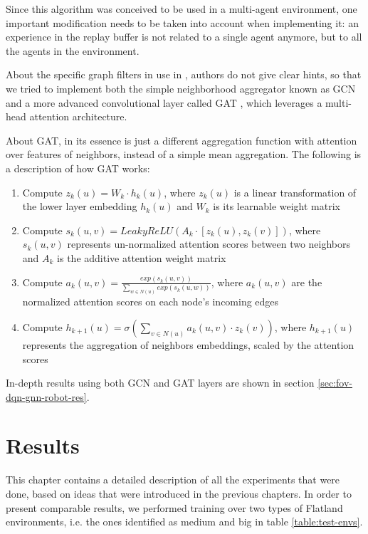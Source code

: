 \documentclass[a4paper,10pt]{report}
\begin{document}
Since this algorithm was conceived to be used in a multi-agent environment, one important modification needs to be taken into account when implementing it: an experience in the replay buffer is not related to a single agent anymore, but to all the agents in the environment.

About the specific graph filters in use in \cite{dqn-gnn-robot}, authors do not give clear hints, so that we tried to implement both the simple neighborhood aggregator known as GCN \cite{gcn} and a more advanced convolutional layer called GAT \cite{gat}, which leverages a multi-head attention architecture.

About GAT, in its essence is just a different aggregation function with attention over features of neighbors, instead of a simple mean aggregation. The following is a description of how GAT works:
\begin{enumerate}
	\item Compute $z_k(u)=W_k\cdot h_k(u)$, where $z_k(u)$ is a linear transformation of the lower layer embedding $h_k(u)$ and $W_k$ is its learnable weight matrix
	\item Compute $s_k(u, v)=LeakyReLU\left(A_k\cdot [z_k(u), z_k(v)]\right)$, where $s_k(u, v)$ represents un-normalized attention scores between two neighbors and $A_k$ is the additive attention weight matrix
	\item Compute $a_k(u, v)=\frac{exp(s_k(u, v))}{\sum_{w\in N(u)}exp(s_k(u,w))}$, where $a_k(u, v)$ are the normalized attention scores on each node's incoming edges
	\item Compute $h_{k+1}(u)=\sigma\left(\sum_{v\in N(u)}a_k(u,v)\cdot z_k(v)\right)$, where $h_{k+1}(u)$ represents the aggregation of neighbors embeddings, scaled by the attention scores
\end{enumerate}

In-depth results using both GCN and GAT layers are shown in section \ref{sec:fov-dqn-gnn-robot-res}.


\chapter{Results}\label{chap:results}
This chapter contains a detailed description of all the experiments that were done, based on ideas that were introduced in the previous chapters. In order to present comparable results, we performed training over two types of Flatland environments, i.e. the ones identified as medium and big in table \ref{table:test-envs}.
\end{document}
